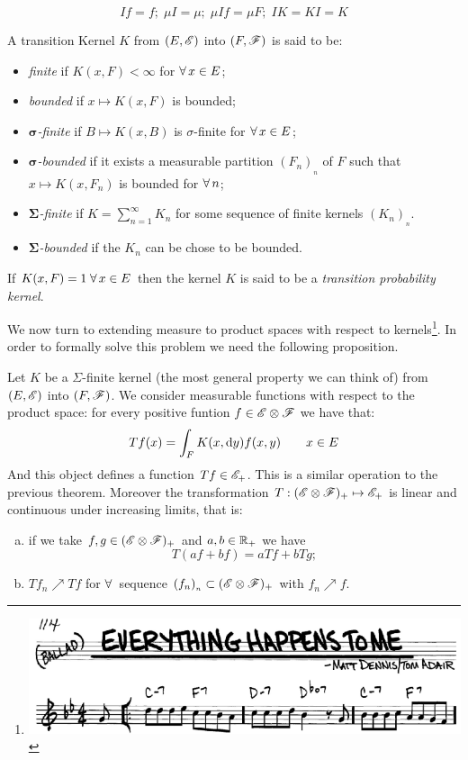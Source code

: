 \documentclass{report}
\begin{document}
\begin{remark}
	\[If=f;\;\mu I=\mu;\;\mu If=\mu F;\; IK=KI=K\]
\end{remark}
\begin{definition}
	A transition Kernel $K$ from $(E,\mathscr{E})$ into $(F,\mathscr{F})$ is said to be:
	\begin{itemize}
		\item \emph{finite} if $K(x,F)<\infty$ for $\forall\, x\in E$;
		\item \emph{bounded} if $x\mapsto K(x,F)$ is bounded;
		\item \emph{$\mathbf{\sigma}$-finite} if $B\mapsto K(x,B)$ is $\sigma$-finite for $\forall\, x\in E$;
		\item \emph{$\mathbf{\sigma}$-bounded} if it exists a measurable partition $(F_n)_{_{n}}$ of $F$ such that $x\mapsto K(x,F_n)$ is bounded for $\forall\, n$;
		\item \emph{$\mathbf{\Sigma}$-finite} if $K=\sum_{n=1}^{\infty}K_n$ for some sequence of finite kernels $(K_n)_{_{n}}$.
		\item \emph{$\mathbf{\Sigma}$-bounded} if the $K_{n}$ can be chose to be bounded.
	\end{itemize}
\end{definition}
\begin{definition}
	If $K(x,F)=1\;\forall\, x \in E$ then the kernel $K$ is said to be a \emph{transition probability kernel}.
\end{definition}
We now turn to extending measure to product spaces with respect to kernels\footnote{\includegraphics[width=0.5\linewidth]{everything}}. In order to formally solve this problem we need the following proposition.
\begin{proposition}
	Let $K$ be a $\Sigma$-finite kernel (the most general property we can think of) from $(E,\mathscr{E})$ into $(F,\mathscr{F})$. We consider measurable functions with respect to the product space: for every positive funtion $f\in\mathscr{E}\otimes\mathscr{F}$ we have that:
	\[Tf(x)=\int_FK(x,\mathop{}\!\mathrm{d} y)f(x,y)\qquad x\in E\]
	And this object defines a function $Tf\in\mathscr{E}_+$. This is a similar operation to the previous theorem. Moreover the transformation $T:(\mathscr{E}\otimes\mathscr{F})_+\mapsto \mathscr{E}_+$ is linear and continuous under increasing limits, that is:
	\begin{enumerate}[a)]
		\item if we take $f,g\in(\mathscr{E}\otimes\mathscr{F})_+$ and $a,b\in\mathbb{R}_+$ we have
		\[T(af+bf)=aTf+bTg;\]
		\item $Tf_n\nearrow Tf$ for $\forall\,$ sequence $(f_n)_{_{n}}\subset(\mathscr{E}\otimes\mathscr{F})_+$ with $f_n\nearrow f$.
	\end{enumerate}
\end{proposition}
\end{document}
